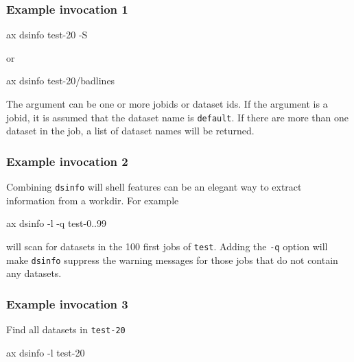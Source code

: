 \subsubsection*{Example invocation 1}
\begin{shell}
ax dsinfo test-20 -S
\end{shell}
or
\begin{shell}
ax dsinfo test-20/badlines
\end{shell}

The argument can be one or more jobids or dataset ids.  If the
argument is a jobid, it is assumed that the dataset name is
\texttt{default}.  If there are more than one dataset in the job, a
list of dataset names will be returned.

\subsubsection*{Example invocation 2}
Combining \texttt{dsinfo} will shell features can be an elegant way to
extract information from a workdir.  For example
\begin{shell}
ax dsinfo -l -q test-{0..99}
\end{shell}
will scan for datasets in the 100 first jobs of \texttt{test}.
Adding the \texttt{-q} option will make \texttt{dsinfo} suppress the
warning messages for those jobs that do not contain any datasets.

\subsubsection*{Example invocation 3}
Find all datasets in \texttt{test-20}
\begin{shell}
ax dsinfo -l test-20
\end{shell}


